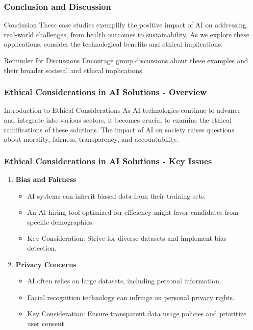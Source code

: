 \documentclass{beamer}
\begin{document}
\begin{frame}[fragile]
    \frametitle{Conclusion and Discussion}
    \begin{block}{Conclusion}
        These case studies exemplify the positive impact of AI on addressing real-world challenges, from health outcomes to sustainability. As we explore these applications, consider the technological benefits and ethical implications.
    \end{block}

    \begin{block}{Reminder for Discussions}
        Encourage group discussions about these examples and their broader societal and ethical implications.
    \end{block}
\end{frame}

\begin{frame}[fragile]
    \frametitle{Ethical Considerations in AI Solutions - Overview}
    \begin{block}{Introduction to Ethical Considerations}
        As AI technologies continue to advance and integrate into various sectors, it becomes crucial to examine the ethical ramifications of these solutions. The impact of AI on society raises questions about morality, fairness, transparency, and accountability.
    \end{block}
\end{frame}

\begin{frame}[fragile]
    \frametitle{Ethical Considerations in AI Solutions - Key Issues}
    \begin{enumerate}
        \item \textbf{Bias and Fairness}
            \begin{itemize}
                \item AI systems can inherit biased data from their training sets.
                \item An AI hiring tool optimized for efficiency might favor candidates from specific demographics.
                \item Key Consideration: Strive for diverse datasets and implement bias detection.
            \end{itemize}
        
        \item \textbf{Privacy Concerns}
            \begin{itemize}
                \item AI often relies on large datasets, including personal information.
                \item Facial recognition technology can infringe on personal privacy rights.
                \item Key Consideration: Ensure transparent data usage policies and prioritize user consent.
            \end{itemize}
    \end{enumerate}
\end{frame}
\end{document}
